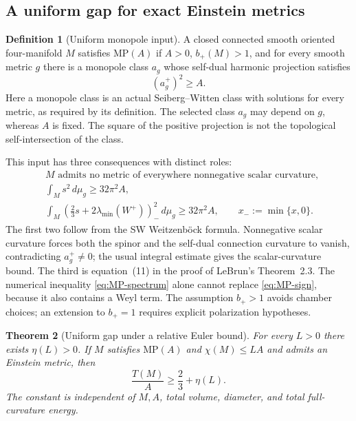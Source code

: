 \documentclass[a4paper,11pt]{article}
\numberwithin{equation}{section}
\newtheorem{theorem}{Theorem}[section]
\theoremstyle{definition}
\newtheorem{definition}[theorem]{Definition}
\newcommand{\dd}{\,d\mu_g}
\begin{document}
\subsection{A uniform gap for exact Einstein metrics}
\begin{definition}[Uniform monopole input]\label{def:MP}
A closed connected smooth oriented four-manifold $M$ satisfies $\mathrm{MP}(A)$ if $A>0$, $b_+(M)>1$, and for every smooth metric $g$ there is a monopole class $a_g$ whose self-dual harmonic projection satisfies
\[
(a_g^+)^2\ge A.
\]
Here a monopole class is an actual Seiberg--Witten class with solutions for every metric, as required by its definition. The selected class $a_g$ may depend on $g$, whereas $A$ is fixed. The square of the positive projection is not the topological self-intersection of the class.
\end{definition}

This input has three consequences with distinct roles:
\begin{align}
&M\text{ admits no metric of everywhere nonnegative scalar curvature},\label{eq:MP-sign}\\
&\int_Ms^2\dd\ge32\pi^2A,\label{eq:MP-scalar}\\
&\int_M\left(\frac23s+2\lambda_{\min}(W^+)\right)_{-}^{\!2}\dd
 \ge32\pi^2A,\qquad x_-:=\min\{x,0\}.\label{eq:MP-spectrum}
\end{align}
The first two follow from the SW Weitzenb\"ock formula. Nonnegative scalar curvature forces both the spinor and the self-dual connection curvature to vanish, contradicting $a_g^+\ne0$; the usual integral estimate gives the scalar-curvature bound. The third is equation~(11) in the proof of LeBrun's Theorem~2.3\cite{LeBrun2001}. The numerical inequality \eqref{eq:MP-spectrum} alone cannot replace \eqref{eq:MP-sign}, because it also contains a Weyl term. The assumption $b_+>1$ avoids chamber choices; an extension to $b_+=1$ requires explicit polarization hypotheses.

\begin{theorem}[Uniform gap under a relative Euler bound]\label{thm:relative-gap}
For every $L>0$ there exists $\eta(L)>0$. If $M$ satisfies $\mathrm{MP}(A)$ and $\chi(M)\le LA$ and admits an Einstein metric, then
\begin{equation}\label{eq:relative-gap}
\frac{T(M)}A\ge\frac23+\eta(L).
\end{equation}
The constant is independent of $M,A$, total volume, diameter, and total full-curvature energy.
\end{theorem}
\end{document}
